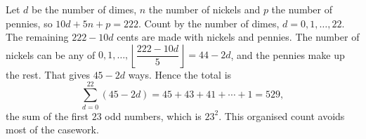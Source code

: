 Let $d$ be the number of dimes, $n$ the number of nickels and $p$ the number of pennies, so $10d+5n+p=222$. Count by the number of dimes, $d=0,1,\dots,22$. The remaining $222-10d$ cents are made with nickels and pennies. The number of nickels can be any of $0,1,\dots,\left\lfloor\dfrac{222-10d}{5}\right\rfloor=44-2d$, and the pennies make up the rest. That gives $45-2d$ ways. Hence the total is
\[
\sum_{d=0}^{22}(45-2d)=45+43+41+\cdots+1=\boxed{529},
\]
the sum of the first $23$ odd numbers, which is $23^2$. This organised count avoids most of the casework.
